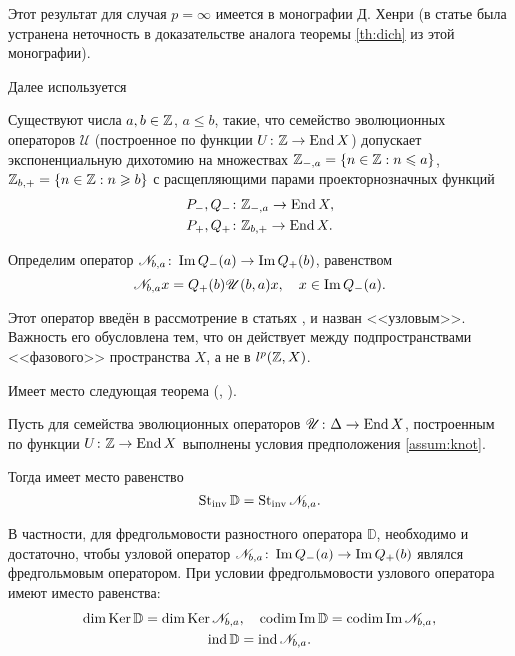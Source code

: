 Этот результат для случая $p=\infty$ имеется в монографии Д. Хенри \cite{henri} (в статье \cite{BasPas01} была устранена неточность в доказательстве аналога теоремы \ref{th:dich} из этой монографии).

Далее используется
\begin{assumption}\label{assum:knot}
    Существуют числа $a, b \in \mathbb{Z}$, $a \leq b$, такие, что семейство эволюционных операторов $\mathcal U$ (построенное по функции $U\colon \mathbb{Z} \to \operatorname{End} X$) допускает экспоненциальную дихотомию на множествах $\mathbb{Z}_{-, a} = \left\{n \in \mathbb{Z} : n \leqslant a\right\}$, $\mathbb{Z}_{b,+} = \left\{n \in \mathbb{Z} : n \geqslant b\right\}$ с расщепляющими парами проекторнозначных функций
    \begin{align*}
        P_{-}, Q_{-} &\colon \mathbb{Z}_{-,a} \to \operatorname{End} X,\\
        P_{+}, Q_{+} &\colon \mathbb{Z}_{b,+} \to \operatorname{End} X.
    \end{align*}
\end{assumption}

Определим оператор $\mathcal N_{b, a} \colon \operatorname{Im} Q_{-}(a) \to \operatorname{Im} Q_{+}(b)$, равенством
\[ \mathcal N_{b, a} x = Q_{+}(b) \mathcal U(b, a) x, \quad x \in \operatorname{Im} Q_{-}(a).\]

Этот оператор введён в рассмотрение в статьях \cite{Bas00}, \cite{Bas13} и назван <<узловым>>. Важность его обусловлена тем, что он действует между подпространствами <<фазового>> пространства $X$, а не в $l^p(\mathbb{Z}, X)$.

Имеет место следующая теорема (\cite{Bas00}, \cite{Bas13}).
\begin{theorem}\label{th:knot_stinv}
    Пусть для семейства эволюционных операторов $\mathcal U \colon \Delta \hm\to \End X$, построенным по функции $U\colon \mathbb{Z} \to \operatorname{End} X$ выполнены условия предположения \ref{assum:knot}.

    Тогда имеет место равенство
    \[ \operatorname{St_{inv}}{\mathbb D} = \operatorname{St_{inv}}{\mathcal N_{b, a}}.\]

    В частности, для фредгольмовости разностного оператора $\mathbb D$, необходимо и достаточно, чтобы узловой оператор $\mathcal N_{b, a} \colon \operatorname{Im} Q_{-}(a) \to \operatorname{Im} Q_{+}(b)$ являлся фредгольмовым оператором. При условии фредгольмовости узлового оператора имеют иместо равенства:
    \begin{gather*}
        \dim \operatorname{Ker} \mathbb D = \dim \operatorname{Ker} \mathcal N_{b, a}, \quad
        \operatorname{codim} \operatorname{Im} \mathbb D = \operatorname{codim} \operatorname{Im} \mathcal N_{b, a}, \\
        \operatorname{ind} \mathbb D = \operatorname{ind} \mathcal N_{b, a}.
    \end{gather*}
\end{theorem}

